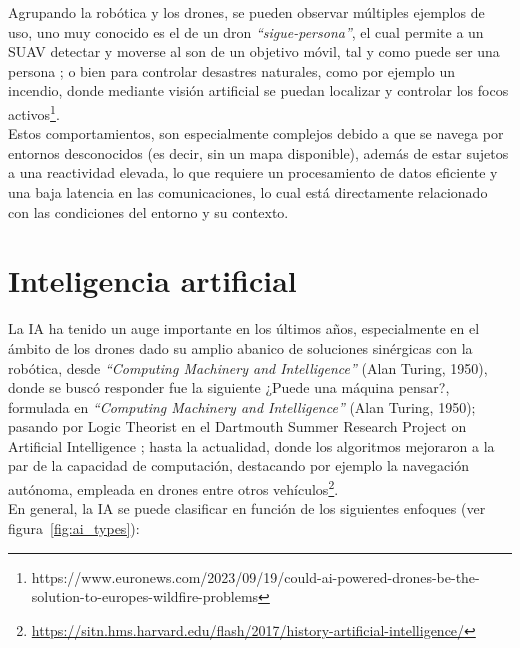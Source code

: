 Agrupando la robótica y los drones, se pueden observar múltiples ejemplos de uso, uno muy conocido es el de un dron \emph{``sigue-persona''}, el cual permite a un \ac{SUAV} detectar y moverse al son de un objetivo móvil, tal y como puede ser una persona \cite{8967675}; o bien para controlar desastres naturales, como por ejemplo un incendio, donde mediante visión artificial se puedan localizar y controlar los focos activos\footnote[13]{https://www.euronews.com/2023/09/19/could-ai-powered-drones-be-the-solution-to-europes-wildfire-problems}.\\

Estos comportamientos, son especialmente complejos debido a que se navega por entornos desconocidos (es decir, sin un mapa disponible), además de estar sujetos a una reactividad elevada, lo que requiere un procesamiento de datos eficiente y una baja latencia en las comunicaciones, lo cual está directamente relacionado con las condiciones del entorno y su contexto.

\section{Inteligencia artificial}
\label{subsec:inteligencia_artificial}

La \ac{IA} ha tenido un auge importante en los últimos años, especialmente en el ámbito de los drones dado su amplio abanico de soluciones sinérgicas con la robótica, desde \emph{``Computing Machinery and Intelligence''} (Alan Turing, 1950), donde se buscó responder fue la siguiente ¿Puede una máquina pensar?, formulada en \emph{``Computing Machinery and Intelligence''} (Alan Turing, 1950); pasando por Logic Theorist en el Dartmouth Summer Research Project on Artificial Intelligence \cite{logic-theorist}; hasta la actualidad, donde los algoritmos mejoraron a la par de la capacidad de computación, destacando por ejemplo la navegación autónoma, empleada en drones entre otros vehículos\footnote[14]{\url{https://sitn.hms.harvard.edu/flash/2017/history-artificial-intelligence/}}.\\

En general, la \ac{IA} se puede clasificar en función de los siguientes enfoques (ver figura~\ref{fig:ai_types}):

